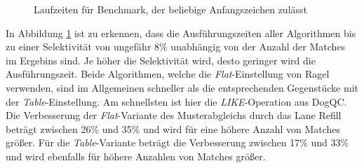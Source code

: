 \begin{figure}[]
	\centering
	\caption{Laufzeiten für Benchmark, der beliebige Anfangszeichen zulässt}
	\label{fig:regex_ANYdblpANY}
\end{figure}

In Abbildung \ref{fig:regex_ANYdblpANY} ist zu erkennen, dass die Ausführungszeiten aller Algorithmen bis zu einer Selektivität von ungefähr 8\% unabhängig von der Anzahl der Matches im Ergebins sind.
Je höher die Selektivität wird, desto geringer wird die Ausführungszeit.
Beide Algorithmen, welche die \emph{Flat}-Einstellung von Ragel verwenden, sind im Allgemeinen schneller als die entsprechenden Gegenstücke mit der \emph{Table}-Einstellung.
Am schnellsten ist hier die \emph{LIKE}-Operation aus DogQC.
Die Verbesserung der \emph{Flat}-Variante des Musterabgleichs durch das Lane Refill beträgt zwischen 26\% und 35\% und wird für eine höhere Anzahl von Matches größer.
Für die \emph{Table}-Variante beträgt die Verbesserung zwischen 17\% und 33\% und wird ebenfalls für höhere Anzahlen von Matches größer.

